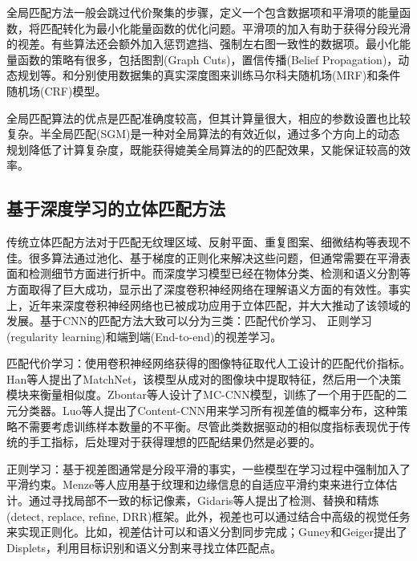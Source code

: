 全局匹配方法一般会跳过代价聚集的步骤，定义一个包含数据项和平滑项的能量函数，将匹配转化为最小化能量函数的优化问题。平滑项的加入有助于获得分段光滑的视差。有些算法还会额外加入惩罚遮挡\cite{SGM_13}、强制左右图一致性\cite{Zitnick:2004}的数据项。最小化能量函数的策略有很多，包括图割(Graph Cuts)\cite{SGM_13}，置信传播(Belief Propagation)\cite{SGM_3}，动态规划\cite{VanMeerbergen2002}等。\cite{MRF}和\cite{CRF}分别使用数据集的真实深度图来训练马尔科夫随机场(MRF)和条件随机场(CRF)模型。

全局匹配算法的优点是匹配准确度较高，但其计算量很大，相应的参数设置也比较复杂。半全局匹配(SGM)\cite{Hirschmuller08}是一种对全局算法的有效近似，通过多个方向上的动态规划降低了计算复杂度，既能获得媲美全局算法的的匹配效果，又能保证较高的效率。

\subsection{基于深度学习的立体匹配方法}
传统立体匹配方法对于匹配无纹理区域、反射平面、重复图案、细微结构等表现不佳。很多算法通过池化、基于梯度的正则化\cite{geiger2010efficient, hirschmuller2005accurate}来解决这些问题，但通常需要在平滑表面和检测细节方面进行折中。而深度学习模型已经在物体分类\cite{krizhevsky2012imagenet}、检测\cite{girshick2014rich}和语义分割\cite{badrinarayanan2015segnet}等方面取得了巨大成功，显示出了深度卷积神经网络在理解语义方面的有效性。事实上，近年来深度卷积神经网络也已被成功应用于立体匹配，并大大推动了该领域的发展。基于CNN的匹配方法大致可以分为三类：匹配代价学习、
正则学习(regularity learning)和端到端(End-to-end)的视差学习。

匹配代价学习：使用卷积神经网络获得的图像特征取代人工设计的匹配代价指标。Han等人\cite{Han_2015_CVPR}提出了MatchNet，该模型从成对的图像块中提取特征，然后用一个决策模块来衡量相似度。Zbontar等人\cite{zbontar2016stereo}设计了MC-CNN模型，训练了一个用于匹配的二元分类器。Luo等人\cite{luo2016efficient}提出了Content-CNN用来学习所有视差值的概率分布，这种策略不需要考虑训练样本数量的不平衡。尽管此类数据驱动的相似度指标表现优于传统的手工指标，后处理对于获得理想的匹配结果仍然是必要的。

正则学习：基于视差图通常是分段平滑的事实，一些模型在学习过程中强制加入了平滑约束。Menze等人\cite{Menze_2015_CVPR}应用基于纹理和边缘信息的自适应平滑约束来进行立体估计。通过寻找局部不一致的标记像素，Gidaris等人\cite{gidaris2016detect}提出了检测、替换和精炼(detect, replace, refine, DRR)框架。此外，视差也可以通过结合中高级的视觉任务来实现正则化。比如，视差估计可以和语义分割同步完成\cite{yamaguchi2014}；Guney和Geiger提出了Displets\cite{guney2015displets}，利用目标识别和语义分割来寻找立体匹配点。

